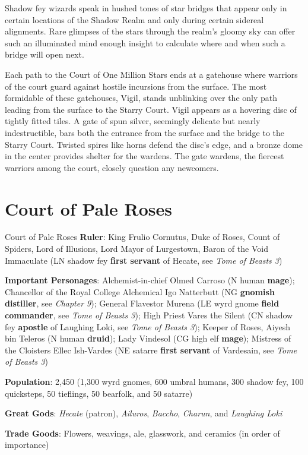 \documentclass[10pt,a4paper,twoside,bg=print,twocolumn,openany,nodeprecatedcode]{dndbook}
\begin{document}
Shadow fey wizards speak in hushed tones of star bridges that appear only in certain locations of the Shadow Realm and only during certain sidereal alignments. Rare glimpses of the stars through the realm's gloomy sky can offer such an illuminated mind enough insight to calculate where and when such a bridge will open next.

Each path to the Court of One Million Stars ends at a gatehouse where warriors of the court guard against hostile incursions from the surface. The most formidable of these gatehouses, Vigil, stands unblinking over the only path leading from the surface to the Starry Court. Vigil appears as a hovering disc of tightly fitted tiles. A gate of spun silver, seemingly delicate but nearly indestructible, bars both the entrance from the surface and the bridge to the Starry Court. Twisted spires like horns defend the disc's edge, and a bronze dome in the center provides shelter for the wardens. The gate wardens, the fiercest warriors among the court, closely question any newcomers.

\section{Court of Pale Roses}
\begin{DndSidebar}[float=!b]{Court of Pale Roses}
\textbf{Ruler}: King Frulio Cornutus, Duke of Roses, Count of Spiders, Lord of Illusions, Lord Mayor of Lurgestown, Baron of the Void Immaculate (LN shadow fey \textbf{first servant} of Hecate, see \textit{Tome of Beasts 3})



\textbf{Important Personages}: Alchemist-in-chief Olmed Carroso (N human \textbf{mage}); Chancellor of the Royal College Alchemical Igo Natterbutt (NG \textbf{gnomish distiller}, see \textit{Chapter 9}); General Flavestor Murena (LE wyrd gnome \textbf{field commander}, see \textit{Tome of Beasts 3}); High Priest Vares the Silent (CN shadow fey \textbf{apostle} of Laughing Loki, see \textit{Tome of Beasts 3}); Keeper of Roses, Aiyesh bin Teleros (N human \textbf{druid}); Lady Vindesol (CG high elf \textbf{mage}); Mistress of the Cloisters Ellec Ish-Vardes (NE satarre \textbf{first servant} of Vardesain, see \textit{Tome of Beasts 3})



\textbf{Population}: 2,450 (1,300 wyrd gnomes, 600 umbral humans, 300 shadow fey, 100 quicksteps, 50 tieflings, 50 bearfolk, and 50 satarre)



\textbf{Great Gods}: \textit{Hecate} (patron), \textit{Ailuros}, \textit{Baccho}, \textit{Charun}, and \textit{Laughing Loki}



\textbf{Trade Goods}: Flowers, weavings, ale, glasswork, and ceramics (in order of importance)





\end{DndSidebar}
\end{document}

